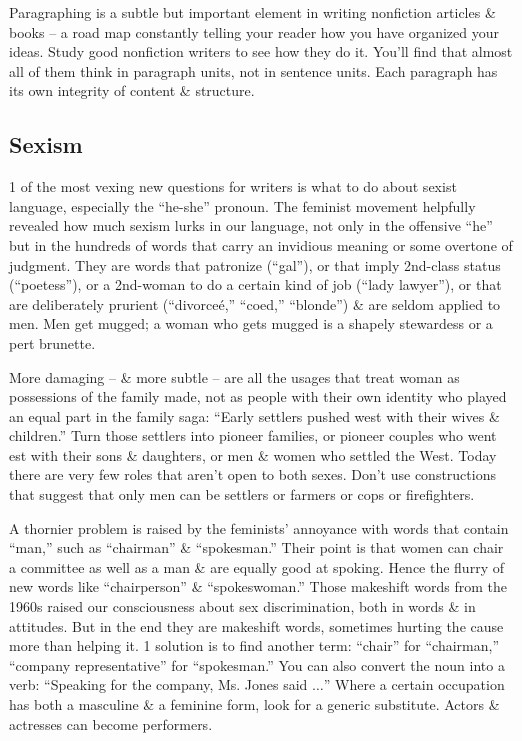 \documentclass{article}
\begin{document}
Paragraphing is a subtle but important element in writing nonfiction articles \& books -- a road map constantly telling your reader how you have organized your ideas. Study good nonfiction writers to see how they do it. You'll find that almost all of them think in paragraph units, not in sentence units. Each paragraph has its own integrity of content \& structure.

\subsection{Sexism}
1 of the most vexing new questions for writers is what to do about sexist language, especially the ``he-she'' pronoun. The feminist movement helpfully revealed how much sexism lurks in our language, not only in the offensive ``he'' but in the hundreds of words that carry an invidious meaning or some overtone of judgment. They are words that patronize (``gal''), or that imply 2nd-class status (``poetess''), or a 2nd-woman to do a certain kind of job (``lady lawyer''), or that are deliberately prurient (``divorce\'e,'' ``coed,'' ``blonde'') \& are seldom applied to men. Men get mugged; a woman who gets mugged is a shapely stewardess or a pert brunette.

More damaging -- \& more subtle -- are all the usages that treat woman as possessions of the family made, not as people with their own identity who played an equal part in the family saga: ``Early settlers pushed west with their wives \& children.'' Turn those settlers into pioneer families, or pioneer couples who went est with their sons \& daughters, or men \& women who settled the West. Today there are very few roles  that aren't open to both sexes. Don't use constructions that suggest that only men can be settlers or farmers or cops or firefighters.

A thornier problem is raised by the feminists' annoyance with words that contain ``man,'' such as ``chairman'' \& ``spokesman.'' Their point is that women can chair a committee as well as a man \& are equally good at spoking. Hence the flurry of new words like ``chairperson'' \& ``spokeswoman.'' Those makeshift words from the 1960s raised our consciousness about sex discrimination, both in words \& in attitudes. But in the end they are makeshift words, sometimes hurting the cause more than helping it. 1 solution is to find another term: ``chair'' for ``chairman,'' ``company representative'' for ``spokesman.'' You can also convert the noun into a verb: ``Speaking for the company, Ms. Jones said $\ldots$'' Where a certain occupation has both a masculine \& a feminine form, look for a generic substitute. Actors \& actresses can become performers.
\end{document}
